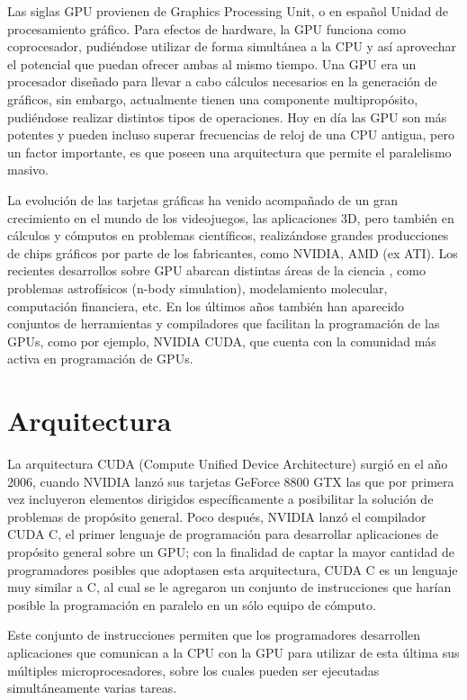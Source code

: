 Las siglas GPU provienen de Graphics Processing Unit, o en español Unidad de
procesamiento gráfico. Para efectos de hardware, la GPU funciona como
coprocesador, pudiéndose utilizar de forma simultánea a la CPU y así aprovechar
el potencial que puedan ofrecer ambas al mismo tiempo.  Una GPU era un
procesador diseñado para llevar a cabo cálculos necesarios en la generación de
gráficos, sin embargo, actualmente tienen una componente multipropósito,
pudiéndose realizar distintos tipos de operaciones. Hoy en día las GPU son más
potentes y pueden incluso superar frecuencias de reloj de una CPU antigua, pero
un factor importante, es que poseen una arquitectura que permite el paralelismo
masivo.

La evolución de las tarjetas gráficas ha venido acompañado de un gran
crecimiento en el mundo de los videojuegos, las aplicaciones 3D, pero también
en cálculos y cómputos en problemas científicos, realizándose
grandes producciones de chips gráficos por parte de los fabricantes, como
NVIDIA, AMD (ex ATI). Los recientes desarrollos sobre GPU abarcan distintas
áreas de la ciencia \cite{kirk2010programming}, como problemas astrofísicos
(n-body simulation), modelamiento molecular, computación financiera, etc. En
los últimos años también han aparecido conjuntos de herramientas y compiladores
que facilitan la programación de las GPUs, como por ejemplo, NVIDIA CUDA, que
cuenta con la comunidad más activa en programación de GPUs.

\section{Arquitectura}

La arquitectura CUDA (Compute Unified Device Architecture) surgió en el año 2006, 
cuando NVIDIA lanzó sus tarjetas GeForce 8800 GTX las que por primera vez 
incluyeron elementos dirigidos específicamente a posibilitar la solución de 
problemas de propósito general. Poco después, NVIDIA lanzó el compilador CUDA 
C, el primer lenguaje de programación para desarrollar aplicaciones de propósito 
general sobre un GPU; con la finalidad de captar la mayor cantidad de 
programadores posibles que adoptasen esta arquitectura, CUDA C es un lenguaje 
muy similar a C, al cual se le agregaron un conjunto de instrucciones que harían 
posible la programación en paralelo en un sólo equipo de cómputo.

Este conjunto de instrucciones permiten que los programadores desarrollen 
aplicaciones que comunican a la CPU con la GPU para utilizar de esta última sus 
múltiples microprocesadores, sobre los cuales pueden ser ejecutadas 
simultáneamente varias tareas.

